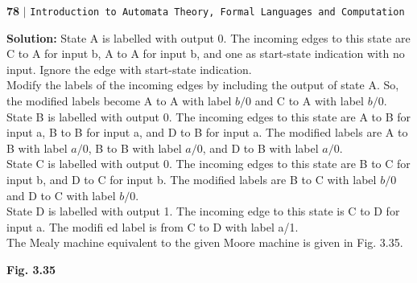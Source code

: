 \documentclass{article}
\begin{document}
\begin{flushleft}
    \textbf{78}\hspace*{0.1cm} \textbf{$|$} \hspace*{0.1cm} \texttt{Introduction to Automata Theory, Formal Languages and Computation}
  \end{flushleft}

\vspace*{0.5cm}
\textbf{Solution:} State A is labelled with output $0$. The incoming edges to this state are C to A for input b, A to
A for input b, and one as start-state indication with no input. Ignore the edge with start-state indication.\\
 \hspace*{0.2cm} Modify the labels of the incoming edges by including the output of state A. So, the modified labels
become A to A with label $b/0$ and C to A with label $b/0$.\\
 \hspace*{0.2cm} State B is labelled with output $0$. The incoming edges to this state are A to B for input a, B to B for
input a, and D to B for input a. The modified labels are A to B with label $a/0$, B to B with label $a/0$, and
D to B with label $a/0$.\\
 \hspace*{0.2cm} State C is labelled with output $0$. The incoming edges to this state are B to C for input b, and D to C
for input b. The modified labels are B to C with label $b/0$ and D to C with label $b/0$.\\

\hspace*{0.2cm} State D is labelled with output 1. The incoming edge to this state is C to D for input a. The modifi ed
label is from C to D with label a/1.\\
 \hspace*{0.2cm} The Mealy machine equivalent to the given Moore machine is given in Fig. 3.35.

\begin{center}
\end{center}
\begin{center}
\textbf{Fig. 3.35}
\end{center}
\end{document}
